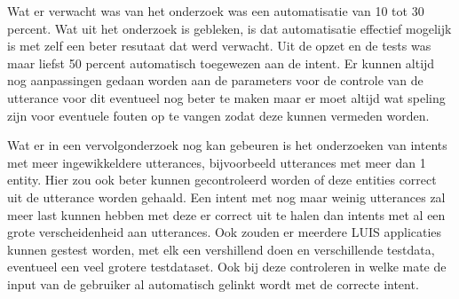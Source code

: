 Wat er verwacht was van het onderzoek was een automatisatie van 10 tot 30 percent. Wat uit het onderzoek is gebleken, is dat automatisatie effectief mogelijk is met zelf een beter resutaat dat werd verwacht. Uit de opzet en de tests was maar liefst 50 percent automatisch toegewezen aan de intent. Er kunnen altijd nog aanpassingen gedaan worden aan de parameters voor de controle van de utterance voor dit eventueel nog beter te maken maar er moet altijd wat speling zijn voor eventuele fouten op te vangen zodat deze kunnen vermeden worden.

Wat er in een vervolgonderzoek nog kan gebeuren is het onderzoeken van intents met meer ingewikkeldere utterances, bijvoorbeeld utterances met meer dan 1 entity. Hier zou ook beter kunnen gecontroleerd worden of deze entities correct uit de utterance worden gehaald. Een intent met nog maar weinig utterances zal meer last kunnen hebben met deze er correct uit te halen dan intents met al een grote verscheidenheid aan utterances. Ook zouden er meerdere LUIS applicaties kunnen gestest worden, met elk een vershillend doen en verschillende testdata, eventueel een veel grotere testdataset. Ook bij deze controleren in welke mate de input van de gebruiker al automatisch gelinkt wordt met de correcte intent.



